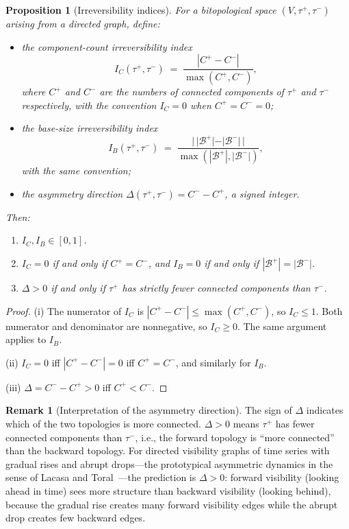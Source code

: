 \documentclass[11pt,a4paper]{article}
\theoremstyle{plain}
\newtheorem{proposition}[theorem]{Proposition}
\theoremstyle{definition}
\newtheorem{remark}[theorem]{Remark}
\newcommand{\taufwd}{\tau^{+}}
\newcommand{\taubwd}{\tau^{-}}
\newcommand{\base}{\mathcal{B}}
\begin{document}
\begin{proposition}[Irreversibility indices]%
\label{prop:irreversibility-indices}
For a bitopological space $(V, \taufwd, \taubwd)$ arising from a directed
graph, define:
\begin{itemize}[nosep]
  \item the \emph{component-count irreversibility index}
        \[
          I_C(\taufwd, \taubwd)
          \;=\; \frac{|C^{+} - C^{-}|}{\max(C^{+}, C^{-})},
        \]
        where $C^{+}$ and $C^{-}$ are the numbers of connected components of
        $\taufwd$ and $\taubwd$ respectively, with the convention $I_C = 0$
        when $C^{+} = C^{-} = 0$;
  \item the \emph{base-size irreversibility index}
        \[
          I_B(\taufwd, \taubwd)
          \;=\; \frac{|\,|\base^{+}| - |\base^{-}|\,|}%
                     {\max(|\base^{+}|, |\base^{-}|)},
        \]
        with the same convention;
  \item the \emph{asymmetry direction}
        $\Delta(\taufwd, \taubwd) = C^{-} - C^{+}$,
        a signed integer.
\end{itemize}
Then:
\begin{enumerate}[label=(\roman*),nosep]
  \item $I_C, I_B \in [0, 1]$.
  \item $I_C = 0$ if and only if $C^{+} = C^{-}$, and $I_B = 0$ if and only
        if $|\base^{+}| = |\base^{-}|$.
  \item $\Delta > 0$ if and only if $\taufwd$ has strictly fewer connected
        components than $\taubwd$.
\end{enumerate}
\end{proposition}

\begin{proof}
(i) The numerator of $I_C$ is $|C^{+} - C^{-}| \leq \max(C^{+}, C^{-})$,
so $I_C \leq 1$.  Both numerator and denominator are nonneg\-ative, so
$I_C \geq 0$.  The same argument applies to $I_B$.

(ii) $I_C = 0$ iff $|C^{+} - C^{-}| = 0$ iff $C^{+} = C^{-}$, and
similarly for $I_B$.

(iii) $\Delta = C^{-} - C^{+} > 0$ iff $C^{+} < C^{-}$.
\end{proof}

\begin{remark}[Interpretation of the asymmetry direction]%
\label{rem:asymmetry-direction}
The sign of $\Delta$ indicates which of the two topologies is more
connected.  $\Delta > 0$ means $\taufwd$ has fewer connected components
than $\taubwd$, i.e., the forward topology is ``more connected'' than
the backward topology.  For directed visibility graphs of time series
with gradual rises and abrupt drops---the prototypical asymmetric
dynamics in the sense of Lacasa and Toral~\cite{LacasaToral2010}---the
prediction is $\Delta > 0$: forward visibility (looking ahead in time)
sees more structure than backward visibility (looking behind), because
the gradual rise creates many forward visibility edges while the abrupt
drop creates few backward edges.
\end{remark}
\end{document}
